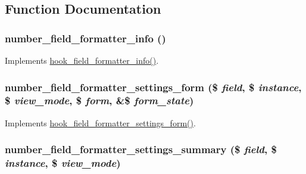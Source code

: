 \subsection{Function Documentation}
\hypertarget{number_8module_ac49646c88cebb39a1eba98873252366a}{
\subsubsection[{number\_\-field\_\-formatter\_\-info}]{\setlength{\rightskip}{0pt plus 5cm}number\_\-field\_\-formatter\_\-info ()}}
\label{number_8module_ac49646c88cebb39a1eba98873252366a}
Implements \hyperlink{group__field__formatter_ga2f5aa1c7455f55dffd84a48efa57f987}{hook\_\-field\_\-formatter\_\-info()}. \hypertarget{number_8module_a2c5abe58ae0410b69e57ad89719b82e4}{
\subsubsection[{number\_\-field\_\-formatter\_\-settings\_\-form}]{\setlength{\rightskip}{0pt plus 5cm}number\_\-field\_\-formatter\_\-settings\_\-form (\$ {\em field}, \/  \$ {\em instance}, \/  \$ {\em view\_\-mode}, \/  \$ {\em form}, \/  \&\$ {\em form\_\-state})}}
\label{number_8module_a2c5abe58ae0410b69e57ad89719b82e4}
Implements \hyperlink{group__field__types_gaf9b6aefe0b4fe6c03ebd5bd9bd1b891b}{hook\_\-field\_\-formatter\_\-settings\_\-form()}. \hypertarget{number_8module_afe760de9ebf67e8e5f715ff7da247c32}{
\subsubsection[{number\_\-field\_\-formatter\_\-settings\_\-summary}]{\setlength{\rightskip}{0pt plus 5cm}number\_\-field\_\-formatter\_\-settings\_\-summary (\$ {\em field}, \/  \$ {\em instance}, \/  \$ {\em view\_\-mode})}}
